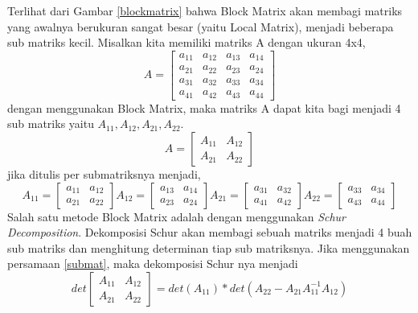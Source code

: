 \documentclass[12pt,a4paper]{report}
\begin{document}
	Terlihat dari Gambar \ref{blockmatrix} bahwa Block Matrix akan membagi matriks yang awalnya berukuran sangat besar (yaitu Local Matrix), menjadi beberapa sub matriks kecil. Misalkan kita memiliki matriks A dengan ukuran 4x4,
	\begin{equation}
	A = 
	\begin{bmatrix}
	\label{submat}
	a_{11} & a_{12} & a_{13} & a_{14} \\
	a_{21} & a_{22} & a_{23} & a_{24} \\
	a_{31} & a_{32} & a_{33} & a_{34} \\
	a_{41} & a_{42} & a_{43} & a_{44}
	\end{bmatrix}
	\end{equation}
	dengan menggunakan Block Matrix, maka matriks A dapat kita bagi menjadi 4 sub matriks yaitu {$A_{11}, A_{12}, A_{21}, A_{22}$}.
	\begin{equation}
	A = 
	\begin{bmatrix}
	A_{11} & A_{12} \\
	A_{21} & A_{22}
	\end{bmatrix}
	\end{equation}
	jika ditulis per submatriksnya menjadi,
	\begin{equation}
	A_{11} = 
	\begin{bmatrix}
	a_{11} & a_{12} \\
	a_{21} & a_{22}
	\end{bmatrix}
	A_{12} = 
	\begin{bmatrix}
	a_{13} & a_{14} \\
	a_{23} & a_{24}
	\end{bmatrix}
	A_{21} = 
	\begin{bmatrix}
	a_{31} & a_{32} \\
	a_{41} & a_{42}
	\end{bmatrix}
	A_{22} = 
	\begin{bmatrix}
	a_{33} & a_{34} \\
	a_{43} & a_{44}
	\end{bmatrix}
	\end{equation}
	Salah satu metode Block Matrix adalah dengan menggunakan \textit{Schur Decomposition}. Dekomposisi Schur akan membagi sebuah matriks menjadi 4 buah sub matriks dan menghitung determinan tiap sub matriksnya. Jika menggunakan persamaan \eqref{submat}, maka dekomposisi Schur nya menjadi
	\begin{equation}
	\label{schur}
	det\begin{bmatrix}
	A_{11} & A_{12} \\
	A_{21} & A_{22}
	\end{bmatrix} = 
	det(A_{11}) * det(A_{22}-A_{21}A_{11}^{-1}A_{12})
	\end{equation}
	
\end{document}
